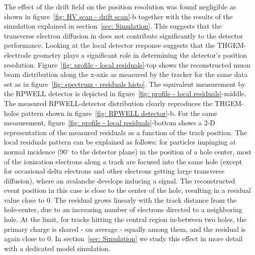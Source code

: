 The effect of the drift field on the position resolution was found negligible as shown in figure~\ref{fig: HV scan - drift scan}-b together with the results of the simulation explained in section~\ref{sec: Simulation}. This suggests that the transverse electron diffusion in \nech does not contribute significantly to the detector performance.  
Looking at the local detector response suggests that the THGEM-electrode geometry plays a significant role in determining the detector's position resolution. Figure~\ref{fig: profile - local residuals}-top shows the reconstructed muon beam distribution along the x-axis as measured by the tracker for the same data set as in figure~\ref{fig: spectrum - residuals histo}. The equivalent measurement by the RPWELL detector is depicted in figure~\ref{fig: profile - local residuals}-middle. The measured RPWELL-detector distribution clearly reproduces the THGEM-holes pattern shown in figure~\ref{fig: RPWELL detector}-b. For the same measurement, figure~\ref{fig: profile - local residuals}-bottom shows a 2-D representation of the measured residuals as a function of the track position. The local residuals pattern can be explained as follows: for particles impinging at normal incidence (90$^\circ$ to the detector plane) in the position of a hole center, most of the ionization electrons along a track are focused into the same hole (except for occasional delta electrons and other electrons getting large transverse diffusion), where an avalanche develops inducing a signal. The reconstructed event position in this case is close to the  center of the hole, resulting in a residual value close to 0. The residual grows linearly with the track distance from the hole-center, due to an increasing number of electrons directed to a neighboring hole. At the limit, for tracks hitting the central region in-between two holes, the primary charge is shared - on average - equally among them, and the residual is again close to 0. In section~\ref{sec: Simulation} we study this effect in more detail with a dedicated model simulation.
